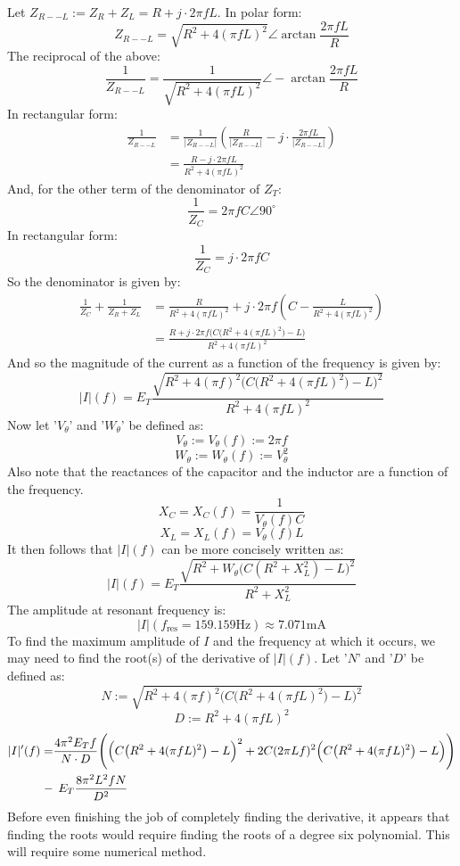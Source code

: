 \documentclass{article}
\begin{document}
	Let $Z_{R--L}:=Z_R + Z_L=R + j \cdot 2\pi f L$.  In polar form:
	$$ Z_{R--L} = \sqrt{R^2 + 4(\pi f L)^2}\angle \arctan \frac{2 \pi f L}{R}$$
	The reciprocal of the above:
	$$ \frac{1}{Z_{R--L}}=\frac{1}{\sqrt{R^2 + 4(\pi f L)^2}}\angle-\arctan 
	\frac{2 \pi f L}{R}$$
	In rectangular form:
	\begin{align*}
		\frac{1}{Z_{R--L}} &= 
		\frac{1}{|Z_{R--L}|}\left(\frac{R}{|Z_{R--L}|} - j\cdot\frac{2\pi f 
		L}{|Z_{R--L}|}\right) \\
		 &= \frac{R-j\cdot 2\pi f L}{R^2 + 4(\pi f L)^2}
	\end{align*}
	And, for the other term of the denominator of $Z_T$:
	$$ \frac{1}{Z_C} = 2\pi f C \angle 90^{\circ}$$
	In rectangular form:
	$$ \frac{1}{Z_C} = j \cdot 2\pi f C$$
	So the denominator is given by:
	\begin{align*}
		\frac{1}{Z_C} + \frac{1}{Z_R + Z_L} &= \frac{R}{R^2+4(\pi f L)^2} + j 
		\cdot 2 \pi f\left(C - \frac{L}{R^2+4(\pi f L)^2}  \right) \\
		 &= \frac{R + j \cdot 2\pi f \Big(C\big(R^2+4(\pi f L)^2\big) - 
		 L\Big)}{R^2+4(\pi f L)^2}
	\end{align*}
	And so the magnitude of the current as a function of the frequency is given 
	by:
	$$ |I|(f) = E_T \frac{\sqrt{R^2 + 4(\pi f)^2\Big(C\big(R^2+4(\pi f 
	L)^2\big) - L\Big)^2}}{R^2+4(\pi f L)^2}$$
	Now let '$V_\theta$' and '$W_\theta$' be defined as:
	$$ V_\theta:=V_\theta(f):=2\pi f$$
	$$ W_\theta:=W_\theta(f):=V_\theta^2$$
	Also note that the reactances of the capacitor and the inductor are a 
	function of the frequency.
	$$ X_C = X_C(f) = \frac{1}{V_\theta (f)C}$$
	$$ X_L = X_L(f) = V_\theta (f)L$$ 
	It then follows that $|I|(f)$ can be more concisely written as:
	$$ |I|(f) = E_T \frac{\sqrt{R^2 + W_\theta\big(C(R^2 +X_L^2 ) - 
	L\big)^2}}{R^2 + X_L^2}$$
	The amplitude at resonant frequency is:
	$$ |I|(f_{\text{res}}=159.159 \text{Hz}) \approx 7.071 \text{mA}$$
	To find the maximum amplitude of $I$ and the frequency at which it occurs, 
	we may need to find the root(s) of the derivative of $|I|(f)$.
	Let '$N$' and '$D$' be defined as:
	$$ N:=\sqrt{R^2 + 4(\pi f)^2\Big(C\big(R^2+4(\pi f 
		L)^2\big) - L\Big)^2}$$
	$$ D:=R^2+4(\pi f L)^2$$
	\begin{align*}
		|I|'(f) =&\frac {4\pi^2 E_T f}{N\cdot D} \Bigg(\Big(C\big(R^2+4(\pi f 
		L)^2\big) - L\Big)^2 +  2C(2\pi Lf)^2\Big(C\big(R^2+4(\pi f 
		L)^2\big) - L\Big)\Bigg) \\
		 -& \hspace{1ex}E_T \frac{8\pi^2L^2 f N}{D^2}
	\end{align*}
	Before even finishing the job of completely finding the derivative, it 
	appears that finding the roots would require finding the roots of a degree 
	six polynomial.  This will require some numerical method.
\end{document}
